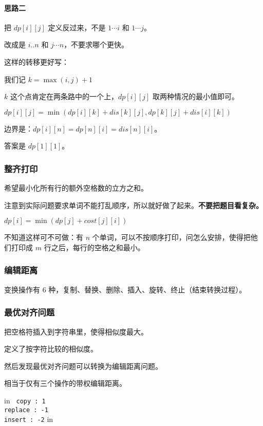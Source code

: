 \paragraph{思路二}

把 $dp[i][j]$ 定义反过来，不是 $1 \cdots i$ 和 $1 \cdots j$。

改成是 $i..n$ 和 $j \cdots n$，不要求哪个更快。

这样的转移更好写：

我们记 $k = \max(i, j) + 1$

$k$ 这个点肯定在两条路中的一个上，$dp[i][j]$ 取两种情况的最小值即可。

$dp[i][j] = \min(dp[i][k] + dis[k][j], dp[k][j] + dis[i][k])$

边界是：$dp[i][n] = dp[n][i] = dis[n][i]$。

答案是 $dp[1][1]$。

\subsubsection{整齐打印}

希望最小化所有行的额外空格数的立方之和。

注意到实际问题要求单词不能打乱顺序，所以就好做了起来。\textbf{不要把题目看复杂。}

$dp[i] = \min(dp[j] + cost[j][i])$

不知道这样可不可做：有 $n$ 个单词，可以不按顺序打印，问怎么安排，使得把他们打印成 $m$ 行之后，每行的空格之和最小。

\subsubsection{编辑距离}

变换操作有 $6$ 种，复制、替换、删除、插入、旋转、终止（结束转换过程）。

\subsubsection{最优对齐问题}

把空格符插入到字符串里，使得相似度最大。

定义了按字符比较的相似度。

然后发现最优对齐问题可以转换为编辑距离问题。

相当于仅有三个操作的带权编辑距离。

 in
\texttt{
copy    :  1\\replace : -1\\insert  : -2}
 in

